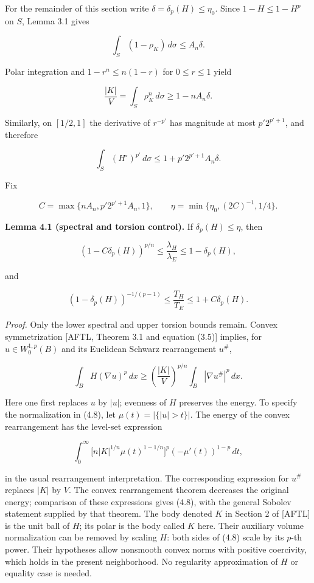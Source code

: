 \documentclass[11pt]{article}
\begin{document}
For the remainder of this section write
\(\delta=\delta_p(H)\leq\eta_0\). Since \(1-H\leq1-H^p\) on \(S\), Lemma
3.1 gives

\[
\int_S(1-\rho_K)\,d\sigma\leq A_n\delta.
\tag{4.2}
\]

Polar integration and \(1-r^n\leq n(1-r)\) for \(0\leq r\leq1\) yield

\[
\frac{|K|}{V}=\int_S\rho_K^n\,d\sigma
\geq1-nA_n\delta.
\tag{4.3}
\]

Similarly, on \([1/2,1]\) the derivative of \(r^{-p'}\) has magnitude at
most \(p'2^{p'+1}\), and therefore

\[
\int_S(H^\circ)^{p'}\,d\sigma
\leq1+p'2^{p'+1}A_n\delta.
\tag{4.4}
\]

Fix

\[
C=\max\{nA_n,p'2^{p'+1}A_n,1\},
\qquad
\eta=\min\{\eta_0,(2C)^{-1},1/4\}.
\tag{4.5}
\]

\textbf{Lemma 4.1 (spectral and torsion control).} If
\(\delta_p(H)\leq\eta\), then

\[
(1-C\delta_p(H))^{p/n}
\leq\frac{\lambda_H}{\lambda_E}\leq1-\delta_p(H),
\tag{4.6}
\]

and

\[
(1-\delta_p(H))^{-1/(p-1)}
\leq\frac{T_H}{T_E}\leq1+C\delta_p(H).
\tag{4.7}
\]

\emph{Proof.} Only the lower spectral and upper torsion bounds remain.
Convex symmetrization {[}AFTL, Theorem 3.1 and equation (3.5){]}
implies, for \(u\in W^{1,p}_0(B)\) and its Euclidean Schwarz
rearrangement \(u^\#\),

\[
\int_BH(\nabla u)^p\,dx
\geq\left(\frac{|K|}{V}\right)^{p/n}
\int_B|\nabla u^\#|^p\,dx.
\tag{4.8}
\]

Here one first replaces \(u\) by \(|u|\); evenness of \(H\) preserves
the energy. To specify the normalization in (4.8), let
\(\mu(t)=|\{|u|>t\}|\). The energy of the convex rearrangement has the
level-set expression

\[
\int_0^\infty
\bigl[n|K|^{1/n}\mu(t)^{1-1/n}\bigr]^p
(-\mu'(t))^{1-p}\,dt,
\tag{4.9}
\]

in the usual rearrangement interpretation. The corresponding expression
for \(u^\#\) replaces \(|K|\) by \(V\). The convex rearrangement theorem
decreases the original energy; comparison of these expressions gives
(4.8), with the general Sobolev statement supplied by that theorem. The
body denoted \(K\) in Section 2 of {[}AFTL{]} is the unit ball of \(H\);
its polar is the body called \(K\) here. Their auxiliary volume
normalization can be removed by scaling \(H\): both sides of (4.8) scale
by its \(p\)-th power. Their hypotheses allow nonsmooth convex norms
with positive coercivity, which holds in the present neighborhood. No
regularity approximation of \(H\) or equality case is needed.
\end{document}
